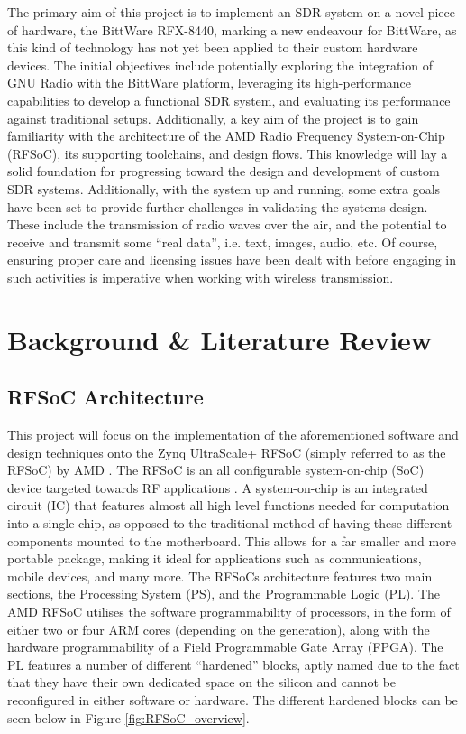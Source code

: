 \documentclass[12pt, a4paper]{article}
\begin{document}
The primary aim of this project is to implement an SDR system on a novel piece of hardware, the BittWare RFX-8440, marking a new endeavour for BittWare, as this kind of technology has not yet been applied to their custom hardware devices. The initial objectives include potentially exploring the integration of GNU Radio with the BittWare platform, leveraging its high-performance capabilities to develop a functional SDR system, and evaluating its performance against traditional setups. Additionally, a key aim of the project is to gain familiarity with the architecture of the AMD Radio Frequency System-on-Chip (RFSoC), its supporting toolchains, and design flows. This knowledge will lay a solid foundation for progressing toward the design and development of custom SDR systems. Additionally, with the system up and running, some extra goals have been set to provide further challenges in validating the systems design. These include the transmission of radio waves over the air, and the potential to receive and transmit some \enquote{real data}, i.e. text, images, audio, etc. Of course, ensuring proper care and licensing issues have been dealt with before engaging in such activities is imperative when working with wireless transmission.

\newpage
\section{Background \& Literature Review}
\subsection{RFSoC Architecture}
This project will focus on the implementation of the aforementioned software and design techniques onto the Zynq UltraScale+ RFSoC (simply referred to as the RFSoC) by AMD \cite{amd_zynq_rfsoc}. The RFSoC is an all configurable system-on-chip (SoC) device targeted towards RF applications \cite{RFSoC_Book}. A system-on-chip is an integrated circuit (IC) that features almost all high level functions needed for computation into a single chip, as opposed to the traditional method of having these different components mounted to the motherboard. This allows for a far smaller and more portable package, making it ideal for applications such as communications, mobile devices, and many more. The RFSoCs architecture features two main sections, the Processing System (PS), and the Programmable Logic (PL). The AMD RFSoC utilises the software programmability of processors, in the form of either two or four ARM cores (depending on the generation), along with the hardware programmability of a Field Programmable Gate Array (FPGA). The PL features a number of different \enquote{hardened} blocks, aptly named due to the fact that they have their own dedicated space on the silicon and cannot be reconfigured in either software or hardware. The different hardened blocks can be seen below in Figure \ref{fig:RFSoC_overview}.
\end{document}
